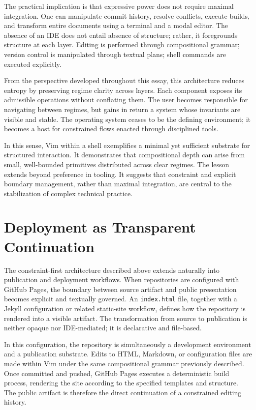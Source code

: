 \documentclass[12pt]{article}
\begin{document}
The practical implication is that expressive power does not require maximal integration. One can manipulate commit history, resolve conflicts, execute builds, and transform entire documents using a terminal and a modal editor. The absence of an IDE does not entail absence of structure; rather, it foregrounds structure at each layer. Editing is performed through compositional grammar; version control is manipulated through textual plans; shell commands are executed explicitly.

From the perspective developed throughout this essay, this architecture reduces entropy by preserving regime clarity across layers. Each component exposes its admissible operations without conflating them. The user becomes responsible for navigating between regimes, but gains in return a system whose invariants are visible and stable. The operating system ceases to be the defining environment; it becomes a host for constrained flows enacted through disciplined tools.

In this sense, Vim within a shell exemplifies a minimal yet sufficient substrate for structured interaction. It demonstrates that compositional depth can arise from small, well-bounded primitives distributed across clear regimes. The lesson extends beyond preference in tooling. It suggests that constraint and explicit boundary management, rather than maximal integration, are central to the stabilization of complex technical practice.

\section{Deployment as Transparent Continuation}

The constraint-first architecture described above extends naturally into publication and deployment workflows. When repositories are configured with GitHub Pages, the boundary between source artifact and public presentation becomes explicit and textually governed. An \texttt{index.html} file, together with a Jekyll configuration or related static-site workflow, defines how the repository is rendered into a visible artifact. The transformation from source to publication is neither opaque nor IDE-mediated; it is declarative and file-based.

In this configuration, the repository is simultaneously a development environment and a publication substrate. Edits to HTML, Markdown, or configuration files are made within Vim under the same compositional grammar previously described. Once committed and pushed, GitHub Pages executes a deterministic build process, rendering the site according to the specified templates and structure. The public artifact is therefore the direct continuation of a constrained editing history.
\end{document}
